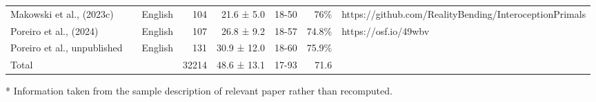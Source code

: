 \begin{table}
\begin{tabular*}{\linewidth}{@{\extracolsep{\fill}}lllrrrrl}
Makowski et al., (2023c) &  & English & 104 & 21.6 ± 5.0 & 18-50 & 76\% & https://github.com/RealityBending/InteroceptionPrimals \\ 
Poreiro et al., (2024) &  & English & 107 & 26.8 ± 9.2 & 18-57 & 74.8\% & https://osf.io/49wbv \\ 
Poreiro et al., unpublished &  & English & 131 & 30.9 ± 12.0 & 18-60 & 75.9\% &  \\ 
Total &  &  & 32214 & 48.6 ± 13.1 & 17-93 & 71.6 &  \\ 
\bottomrule
\end{tabular*}
\begin{minipage}{\linewidth}
* Information taken from the sample description of relevant paper rather than recomputed.\\
\end{minipage}
\end{table}

